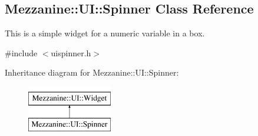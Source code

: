 \hypertarget{classMezzanine_1_1UI_1_1Spinner}{
\subsection{Mezzanine::UI::Spinner Class Reference}
\label{classMezzanine_1_1UI_1_1Spinner}
}


This is a simple widget for a numeric variable in a box.  




{\ttfamily \#include $<$uispinner.h$>$}

Inheritance diagram for Mezzanine::UI::Spinner:\begin{figure}[H]
\begin{center}
\leavevmode
\includegraphics[height=2.000000cm]{classMezzanine_1_1UI_1_1Spinner}
\end{center}
\end{figure}
